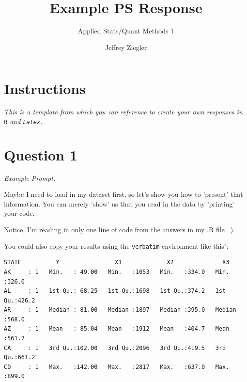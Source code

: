 \documentclass[12pt,letterpaper]{article}
\title{Example PS Response}
\date{Jeffrey Ziegler}
\author{Applied Stats/Quant Methods 1}
\begin{document}
	\maketitle
	
	\section*{Instructions}

 \textit{This is a template from which you can reference to create your own responses in \texttt{R} and \texttt{Latex}.}

\vspace{1cm}
\section*{Question 1 }

\textit{Example Prompt.}\\

\vspace{.25cm}

Maybe I need to load in my dataset first, so let's show you how to 'present' that information. You can merely 'show' us that you read in the data by 'printing' your code. 

  

Notice, I'm reading in only one line of code from the answers in my .R file \texttt{ }).

\vspace{.5cm}

You could also copy your results using the \texttt{verbatim} environment like this":

\begin{verbatim}
STATE          Y                X1             X2              X3       
AK     : 1   Min.   : 49.00   Min.   :1053   Min.   :334.0   Min.   :326.0  
AL     : 1   1st Qu.: 68.25   1st Qu.:1698   1st Qu.:374.2   1st Qu.:426.2  
AR     : 1   Median : 81.00   Median :1897   Median :395.0   Median :568.0  
AZ     : 1   Mean   : 85.04   Mean   :1912   Mean   :404.7   Mean   :561.7  
CA     : 1   3rd Qu.:102.00   3rd Qu.:2096   3rd Qu.:419.5   3rd Qu.:661.2  
CO     : 1   Max.   :142.00   Max.   :2817   Max.   :637.0   Max.   :899.0  
\end{verbatim}
\vspace{.5cm}
\end{document}
